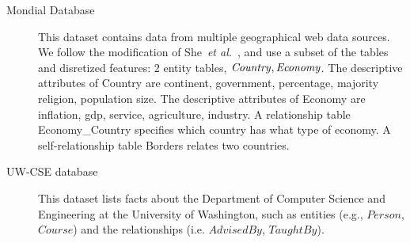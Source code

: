 \documentclass[runningheads,a4paper]{llncs}
\newcommand{\etal}{\textit{et al.}}
\begin{document}
\begin{description}
\item[Mondial Database] 
%
%
This dataset contains data from multiple geographical web data sources. 
We follow the modification of She~\etal~\cite{wangMondial}, and use a subset of the tables and disretized features: 2 entity tables, $\it{Country},\it{Economy}$. The descriptive attributes of Country are continent, government, percentage, majority religion, population size. The descriptive attributes of Economy are inflation, gdp, service, agriculture, industry. A relationship table Economy\_Country specifies which country has what type of economy. A self-relationship table Borders relates two countries.



\item[UW-CSE database] This dataset lists facts about the Department of Computer Science and Engineering at the University of Washington, such as entities (e.g., $Person$, $Course$) and the relationships (i.e. $AdvisedBy$, $TaughtBy$).

\end{description}
\end{document}
